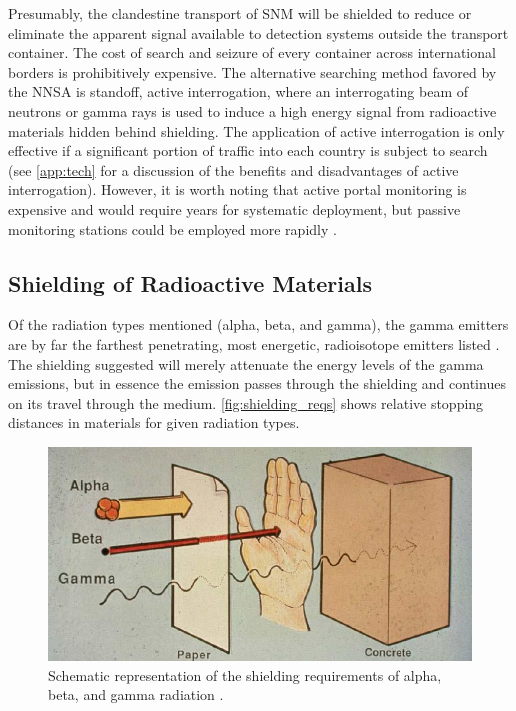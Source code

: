 \documentclass{report}
\begin{document}
Presumably, the clandestine transport of SNM will be shielded to reduce or eliminate the apparent signal available to detection systems outside the transport container. The cost of search and seizure of every container across international borders is prohibitively expensive. The alternative searching method favored by the NNSA is standoff, active interrogation, where an interrogating beam of neutrons or gamma rays is used to induce a high energy signal from radioactive materials hidden behind shielding. The application of active interrogation is only effective if a significant portion of traffic into each country is subject to search (see \autoref{app:tech}  for a discussion of the benefits and disadvantages of active interrogation). However, it is worth noting that active portal monitoring is expensive and would require years for systematic deployment, but passive monitoring stations could be employed more rapidly \cite{Grogan201362}. 

 
\subsection{Shielding of Radioactive Materials}  \label{sec:shielding_mat}


Of the radiation types mentioned (alpha, beta, and gamma), the gamma emitters are by far the farthest penetrating, most energetic, radioisotope emitters listed \cite{krane1987introductory}.  The shielding suggested will merely attenuate the energy levels of the gamma emissions, but in essence the emission passes through the shielding and continues on its travel through the medium. \autoref{fig:shielding_reqs} shows relative stopping distances in materials for given radiation types. 

\begin{figure}
 \centering
 \includegraphics[trim = 0cm 0cm 0cm 0cm, clip,scale=0.5]{./figures/shielding_reqs.jpg}
   \caption{Schematic representation of the shielding requirements of alpha, beta, and gamma radiation \cite{Hallenbeck1994}. }
     \label{fig:shielding_reqs}
\end{figure}
\end{document}
